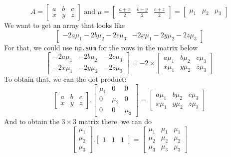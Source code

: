 \documentclass[12pt,reqno]{amsart}
\newcommand{\code}[1]{\texttt{#1}}
\begin{document}
$$
A = \left[\begin{matrix}
a & b & c \\
x & y & z
\end{matrix}\right]
\text{ and } \mu = \left[\begin{matrix}
\frac{a+x}{2} & \frac{b+y}{2} & \frac{c+z}{2}
\end{matrix}\right] = \left[\begin{matrix}\mu_1 & \mu_2 & \mu_3
\end{matrix}\right]
$$
We want to get an array that looks like
$$
\left[
\begin{matrix}
-2a\mu_1-2b\mu_2-2c\mu_3 & -2x\mu_1-2y\mu_2 -2z\mu_3
\end{matrix}
\right]
$$
For that, we could use \code{np.sum} for the rows in the matrix below
$$
\left[
\begin{matrix}
-2a\mu_1 & -2b\mu_2 & -2c\mu_3 \\
-2x\mu_1 & -2y\mu_2 & -2z\mu_3
\end{matrix}
\right]
= -2\times
\left[
\begin{matrix}
a\mu_1 & b\mu_2 & c\mu_3 \\
x\mu_1 & y\mu_2 & z\mu_3
\end{matrix}
\right]
$$
To obtain that, we can the dot product:
$$
\left[\begin{matrix}
a & b & c \\
x & y & z
\end{matrix}\right] . \left[\begin{matrix}
\mu_1 & 0 & 0 \\
0 & \mu_2 & 0 \\
0 & 0 & \mu_3
\end{matrix}\right] = \left[
\begin{matrix}
a\mu_1 & b\mu_2 & c\mu_3 \\
x\mu_1 & y\mu_2 & z\mu_3
\end{matrix}
\right]
$$
And to obtain the $3\times3$ matrix there, we can do
$$
\left[\begin{matrix}\mu_1 \\
\mu_2 \\
\mu_3
\end{matrix}\right] . 
\left[\begin{matrix}
1 & 1 & 1
\end{matrix}\right] 
= 
\left[\begin{matrix}
\mu_1 & \mu_1 & \mu_1 \\
\mu_2 & \mu_2 & \mu_2 \\
\mu_3 & \mu_3 & \mu_3
\end{matrix}\right]
$$
\end{document}
